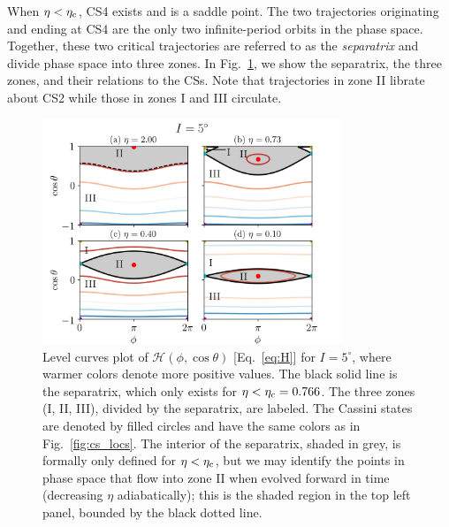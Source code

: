 \documentclass[
        fleqn,
        usenatbib,
    ]{mnras}
\newcommand*{\p}[1]{\left(#1\right)}
\begin{document}
When $\eta < \eta_{\rm c}$, CS4 exists and is a saddle point. The two
trajectories originating and ending at CS4 are the only two infinite-period
orbits in the phase space. Together, these two critical trajectories are
referred to as the \emph{separatrix} and divide phase space into three zones. In
Fig.~\ref{fig:eq_1contours}, we show the separatrix, the three zones, and their
relations to the CSs. Note that trajectories in zone II librate about CS2
while those in zones I and III circulate.
\begin{figure}
    \centering
    \includegraphics[width=0.8\textwidth]{plots_diskdisp/1contours_flip.png}
    \caption{Level curves plot of $\mathcal{H}\p{\phi, \cos \theta}$
    [Eq.~\eqref{eq:H}] for $I = 5^\circ$, where warmer colors denote more
    positive values. The black solid line is the separatrix, which only exists
    for $\eta < \eta_{\rm c} = 0.766$. The three zones (I, II, III), divided by
    the separatrix, are labeled. The Cassini states are denoted by filled
    circles and have the same colors as in Fig.~\ref{fig:cs_locs}. The interior
    of the separatrix, shaded in grey, is formally only defined for $\eta <
    \eta_{\rm c}$, but we may identify the points in phase space that flow into
    zone II when evolved forward in time (decreasing $\eta$ adiabatically); this
    is the shaded region in the top left panel, bounded by the black dotted
    line.}\label{fig:eq_1contours}
\end{figure}
\end{document}
